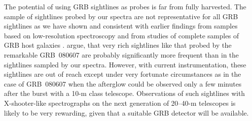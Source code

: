 \documentclass[longauth]{aa}    %
\begin{document}
The potential of using GRB sightlines as probes is far from fully harvested. The
sample of sightlines probed by our spectra are not representative for all GRB
sightlines as we have shown and consistent with earlier findings from samples
based on low-resolution spectroscopy \citep[e.g.,][]{Fynbo2009} and from studies
of complete samples of GRB host galaxies \citep{Hjorth2012, Covino2013,
	Perley2016a}. \cite{Kruhler2013} argue, that very rich sightlines like that
probed by the remarkable GRB~080607 \citep{Prochaska2009, Sheffer2009, Perley2011} are
probably significantly more frequent than in the sightlines sampled by our
spectra. However, with current instrumentation, these sightlines are out of
reach except under very fortunate circumstances as in the case of GRB~080607
when the afterglow could be observed only a few minutes after the burst with a
10-m class telescope. Observations of such sightlines with X-shooter-like
spectrographs on the next generation of 20--40-m telescopes is likely to be very
rewarding, given that a suitable GRB detector will be available.


\end{document}

